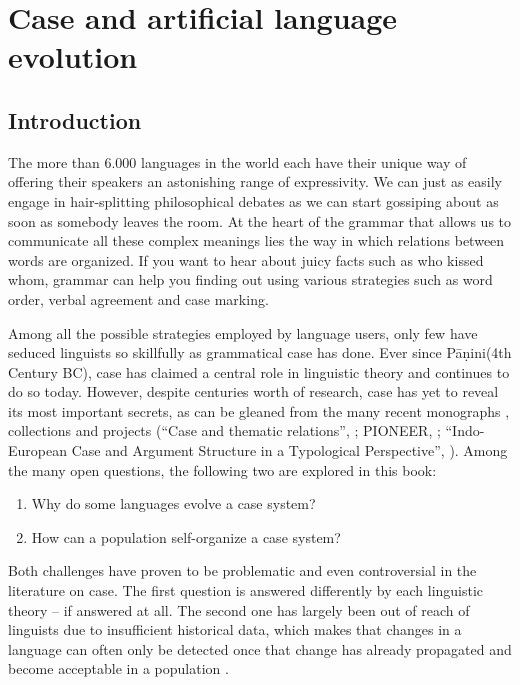 
\chapter{Case and artificial language evolution}
\section{Introduction}
The more than 6.000 languages in the world each have their unique way of offering their speakers an astonishing range of expressivity. We can just as easily engage in hair-splitting philosophical debates as we can start gossiping about as soon as somebody leaves the room. At the heart of the grammar that allows us to communicate all these complex meanings lies the way in which relations between words are organized. If you want to hear about juicy facts such as who kissed whom, grammar can help you finding out using various strategies such as word order, verbal agreement and case marking.

Among all the possible strategies employed by language users, only few have seduced linguists so skillfully as grammatical case has done. Ever since P\={a}\d{n}ini(4th Century BC), case has claimed a central role in linguistic theory and continues to do so today. However, despite centuries worth of research, case has yet to reveal its most important secrets, as can be gleaned from the many recent monographs \citep{blake94case,butt06theories}, collections \citep{kulikov06casebook,barddal09casebook,malchukov09case} and projects (``Case and thematic relations'', \citealp{davidse96functional}; PIONEER, \citealp{amberber05competition}; ``Indo-European Case and Argument Structure in a Typological Perspective'', \citealp{barddal09case}). 
Among the many open questions, the following two are explored in this book:

\begin{enumerate}
\item Why do some languages evolve a case system?
\item How can a population self-organize a case system?
\end{enumerate}

Both challenges have proven to be problematic and even controversial in the literature on case. The first question is answered differently by each linguistic theory -- if answered at all. The second one has largely been out of reach of linguists due to insufficient historical data, which makes that changes in a language can often only be detected once that change has already propagated and become acceptable in a population \citep[34--35]{croft91syntactic}.

